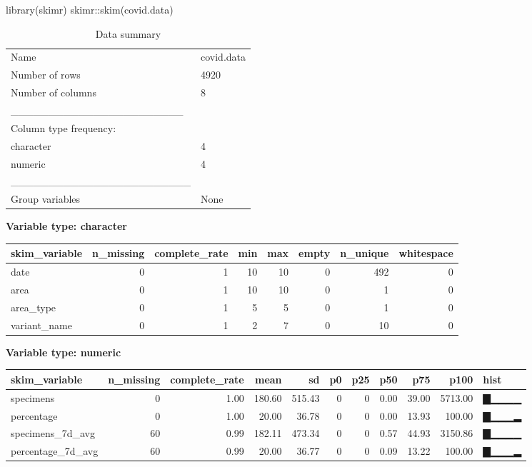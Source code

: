 \documentclass[
]{article}
\newenvironment{Shaded}{\begin{snugshade}}{\end{snugshade}}
\newcommand{\FunctionTok}[1]{\textcolor[rgb]{0.00,0.00,0.00}{#1}}
\newcommand{\NormalTok}[1]{#1}
\newcommand{\SpecialCharTok}[1]{\textcolor[rgb]{0.00,0.00,0.00}{#1}}
\begin{document}
\begin{Shaded}
\begin{Highlighting}[]
\FunctionTok{library}\NormalTok{(skimr)}
\NormalTok{skimr}\SpecialCharTok{::}\FunctionTok{skim}\NormalTok{(covid.data)}
\end{Highlighting}
\end{Shaded}

\begin{longtable}[]{@{}ll@{}}
\caption{Data summary}\tabularnewline
\toprule
\endhead
Name & covid.data \\
Number of rows & 4920 \\
Number of columns & 8 \\
\_\_\_\_\_\_\_\_\_\_\_\_\_\_\_\_\_\_\_\_\_\_\_ & \\
Column type frequency: & \\
character & 4 \\
numeric & 4 \\
\_\_\_\_\_\_\_\_\_\_\_\_\_\_\_\_\_\_\_\_\_\_\_\_ & \\
Group variables & None \\
\bottomrule
\end{longtable}

\textbf{Variable type: character}

\begin{longtable}[]{@{}lrrrrrrr@{}}
\toprule
skim\_variable & n\_missing & complete\_rate & min & max & empty &
n\_unique & whitespace \\
\midrule
\endhead
date & 0 & 1 & 10 & 10 & 0 & 492 & 0 \\
area & 0 & 1 & 10 & 10 & 0 & 1 & 0 \\
area\_type & 0 & 1 & 5 & 5 & 0 & 1 & 0 \\
variant\_name & 0 & 1 & 2 & 7 & 0 & 10 & 0 \\
\bottomrule
\end{longtable}

\textbf{Variable type: numeric}

\begin{longtable}[]{@{}lrrrrrrrrrl@{}}
\toprule
skim\_variable & n\_missing & complete\_rate & mean & sd & p0 & p25 &
p50 & p75 & p100 & hist \\
\midrule
\endhead
specimens & 0 & 1.00 & 180.60 & 515.43 & 0 & 0 & 0.00 & 39.00 & 5713.00
& ▇▁▁▁▁ \\
percentage & 0 & 1.00 & 20.00 & 36.78 & 0 & 0 & 0.00 & 13.93 & 100.00 &
▇▁▁▁▂ \\
specimens\_7d\_avg & 60 & 0.99 & 182.11 & 473.34 & 0 & 0 & 0.57 & 44.93
& 3150.86 & ▇▁▁▁▁ \\
percentage\_7d\_avg & 60 & 0.99 & 20.00 & 36.77 & 0 & 0 & 0.09 & 13.22 &
100.00 & ▇▁▁▁▂ \\
\bottomrule
\end{longtable}
\end{document}
